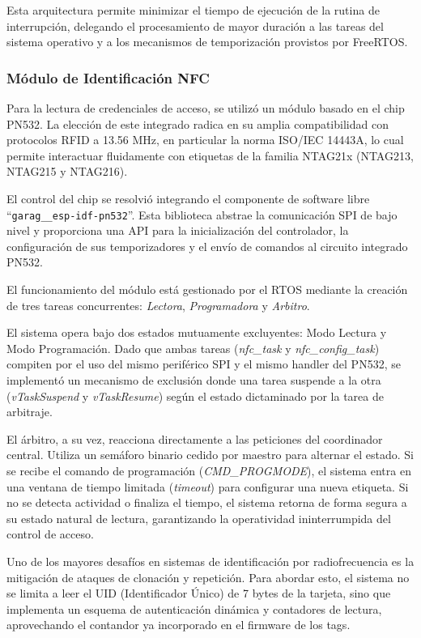 Esta arquitectura permite minimizar el tiempo de ejecución de la rutina de interrupción, delegando el procesamiento de mayor duración a las tareas del sistema operativo y a los mecanismos de temporización provistos por FreeRTOS.

\subsubsection{Módulo de Identificación NFC}

Para la lectura de credenciales de acceso, se utilizó un módulo basado en el chip PN532. La elección de este integrado radica en su amplia compatibilidad con protocolos RFID a 13.56 MHz, en particular la norma ISO/IEC 14443A, lo cual permite interactuar fluidamente con etiquetas de la familia NTAG21x (NTAG213, NTAG215 y NTAG216). 

El control del chip se resolvió integrando el componente de software libre \enquote{\texttt{garag\_\_esp-idf-pn532}}. Esta biblioteca abstrae la comunicación SPI de bajo nivel y proporciona una API para la inicialización del controlador, la configuración de sus temporizadores y el envío de comandos al circuito integrado PN532.

El funcionamiento del módulo está gestionado por el RTOS mediante la creación de tres tareas concurrentes: \textit{Lectora}, \textit{Programadora} y \textit{Arbitro}.

El sistema opera bajo dos estados mutuamente excluyentes: Modo Lectura y Modo Programación. Dado que ambas tareas (\textit{nfc\_task} y \textit{nfc\_config\_task}) compiten por el uso del mismo periférico SPI y el mismo handler del PN532, se implementó un mecanismo de exclusión donde una tarea suspende a la otra (\textit{vTaskSuspend} y \textit{vTaskResume}) según el estado dictaminado por la tarea de arbitraje. 

El árbitro, a su vez, reacciona directamente a las peticiones del coordinador central. Utiliza un semáforo binario cedido por maestro para alternar el estado. Si se recibe el comando de programación (\textit{CMD\_PROGMODE}), el sistema entra en una ventana de tiempo limitada (\textit{timeout}) para configurar una nueva etiqueta. Si no se detecta actividad o finaliza el tiempo, el sistema retorna de forma segura a su estado natural de lectura, garantizando la operatividad ininterrumpida del control de acceso.


Uno de los mayores desafíos en sistemas de identificación por radiofrecuencia es la mitigación de ataques de clonación y repetición. Para abordar esto, el sistema no se limita a leer el UID (Identificador Único) de 7 bytes de la tarjeta, sino que implementa un esquema de autenticación dinámica y contadores de lectura, aprovechando el contandor ya incorporado en el firmware de los tags.

